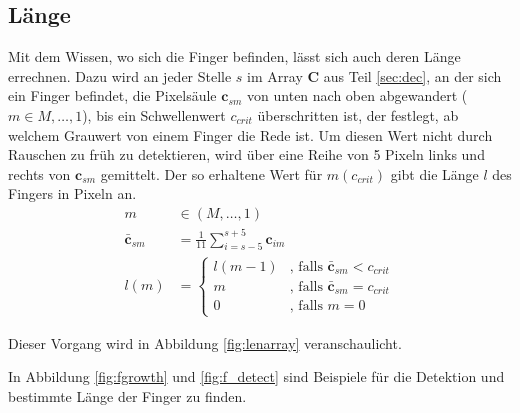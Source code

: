 \subsection{Länge}
\label{sec:lan}
Mit dem Wissen, wo sich die Finger befinden, lässt sich auch deren Länge errechnen. Dazu wird an jeder Stelle $s$ im Array $\mathbf{C}$ aus Teil \ref{sec:dec}, an der sich ein Finger befindet, die Pixelsäule $\mathbf{c}_{sm}$ von unten nach oben abgewandert ($m \in M, \dots, 1$), bis ein Schwellenwert $c_{crit}$ überschritten ist, der festlegt, ab welchem Grauwert von einem Finger die Rede ist. Um diesen Wert nicht durch Rauschen zu früh zu detektieren, wird über eine Reihe von 5 Pixeln links und rechts von $\mathbf{c}_{sm}$ gemittelt. Der so erhaltene Wert für $m(c_{crit})$ gibt die Länge $l$ des Fingers in Pixeln an.
\begin{equation}
\begin{aligned}
 m &\in (M,\dots,1) \\
 \bar{\mathbf{c}}_{sm} &= \frac{1}{11}\sum_{i=s-5}^{s+5} \mathbf{c}_{im} \\
 l(m) &=   \begin{cases}
	    l(m-1) & \text{, falls } \bar{\mathbf{c}}_{sm} < c_{crit}  \\
	    m      & \text{, falls } \bar{\mathbf{c}}_{sm} = c_{crit}  \\
	    0      & \text{, falls } m=0
	   \end{cases}
\end{aligned}
\end{equation}

Dieser Vorgang wird in Abbildung \ref{fig:lenarray} veranschaulicht.
 
In Abbildung \ref{fig:fgrowth} und \ref{fig:f_detect} sind Beispiele für die Detektion und bestimmte Länge der Finger zu finden.


